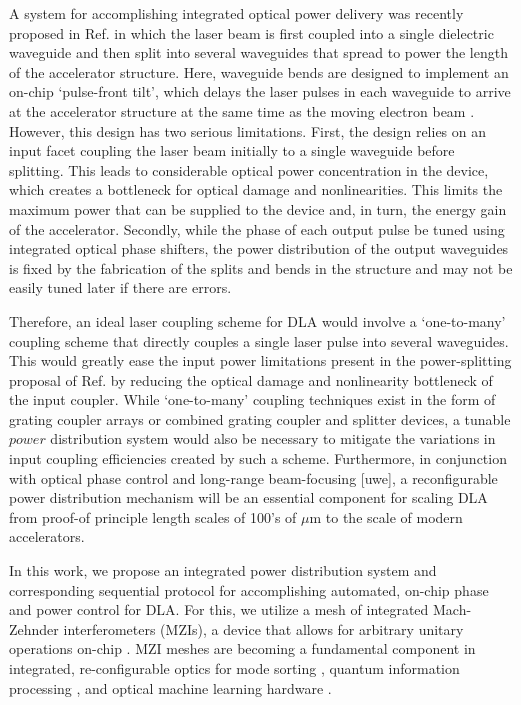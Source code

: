 \documentclass[%
 reprint,
 amsmath,amssymb,
 aps,
prstab,
floatfix,
]{revtex4-1}
\begin{document}
A system for accomplishing integrated optical power delivery was recently proposed in Ref. \cite{hughes_method_2017} in which the laser beam is first coupled into a single dielectric waveguide and then split into several waveguides that spread to power the length of the accelerator structure.  Here, waveguide bends are designed to implement an on-chip `pulse-front tilt', which delays the laser pulses in each waveguide to arrive at the accelerator structure at the same time as the moving electron beam \cite{cesar_optical_2018}.  However, this design has two serious limitations.  First, the design relies on an input facet coupling the laser beam initially to a single waveguide before splitting.  This leads to considerable optical power concentration in the device, which creates a bottleneck for optical damage and nonlinearities.  This limits the maximum power that can be supplied to the device and, in turn, the energy gain of the accelerator.  Secondly, while the phase of each output pulse be tuned using integrated optical phase shifters, the power distribution of the output waveguides is fixed by the fabrication of the splits and bends in the structure and may not be easily tuned later if there are errors.

Therefore, an ideal laser coupling scheme for DLA would involve a `one-to-many' coupling scheme that directly couples a single laser pulse into several waveguides.  This would greatly ease the input power limitations present in the power-splitting proposal of Ref. \cite{hughes_method_2017} by reducing the optical damage and nonlinearity bottleneck of the input coupler.  While `one-to-many' coupling techniques exist in the form of grating coupler arrays or combined grating coupler and splitter devices, a tunable $\textit{power}$ distribution system would also be necessary to mitigate the variations in input coupling efficiencies created by such a scheme.  Furthermore, in conjunction with optical phase control and long-range beam-focusing [uwe], a reconfigurable power distribution mechanism will be an essential component for scaling DLA from proof-of principle length scales of 100's of $\mu$m to the scale of modern accelerators.

In this work, we propose an integrated power distribution system and corresponding sequential protocol for accomplishing automated, on-chip phase and power control for DLA. For this, we utilize a mesh of integrated Mach-Zehnder interferometers (MZIs), a device that allows for arbitrary unitary operations on-chip \cite{miller_self-configuring_2013,miller_perfect_2015}.  MZI meshes are becoming a fundamental component in integrated, re-configurable optics for mode sorting \cite{miller_sorting_2015,annoni_unscrambling_2017,miller_setting_2017,miller_self-configuring_2018}, quantum information processing \cite{harris_quantum_2017,metcalf_multiphoton_2013,aspuru-guzik_photonic_2012,obrien_photonic_2009}, and optical machine learning hardware \cite{shen_deep_2017, hughes_2018_training}. 
\end{document}
